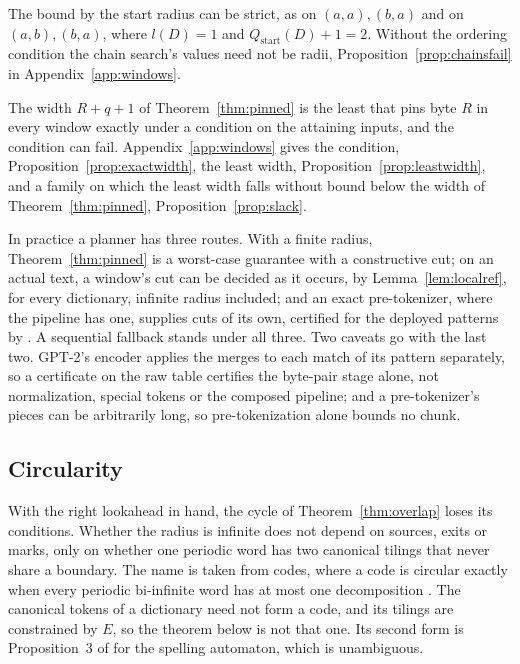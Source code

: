 \documentclass[11pt,a4paper]{article}
\theoremstyle{definition}
\theoremstyle{plain}
\begin{document}
The bound by the start radius can be strict, as on \((a, a), (b, a)\) and on \((a, b), (b, a)\), where \(l(D) = 1\) and
\(Q_{\mathrm{start}}(D) + 1 = 2\). Without the ordering condition the chain search's values need not be radii,
Proposition~\ref{prop:chainsfail} in Appendix~\ref{app:windows}.

The width \(R + q + 1\) of Theorem~\ref{thm:pinned} is the least that pins byte \(R\) in every window exactly under a
condition on the attaining inputs, and the condition can fail. Appendix~\ref{app:windows} gives the condition,
Proposition~\ref{prop:exactwidth}, the least width, Proposition~\ref{prop:leastwidth}, and a family on which the least
width falls without bound below the width of Theorem~\ref{thm:pinned}, Proposition~\ref{prop:slack}.

In practice a planner has three routes. With a finite radius, Theorem~\ref{thm:pinned} is a worst-case guarantee with a
constructive cut; on an actual text, a window's cut can be decided as it occurs, by Lemma~\ref{lem:localref}, for every
dictionary, infinite radius included; and an exact pre-tokenizer, where the pipeline has one, supplies cuts of its own,
certified for the deployed patterns by \citet{nidhogg2026pretokenizer}. A sequential fallback stands under all three.
Two caveats go with the last two. GPT-2's encoder applies the merges to each match of its pattern separately, so a
certificate on the raw table certifies the byte-pair stage alone, not normalization, special tokens or the composed
pipeline; and a pre-tokenizer's pieces can be arbitrarily long, so pre-tokenization alone bounds no chunk.

\subsection{Circularity}\label{sec:circularity}

With the right lookahead in hand, the cycle of Theorem~\ref{thm:overlap} loses its conditions. Whether the radius is
infinite does not depend on sources, exits or marks, only on whether one periodic word has two canonical tilings that
never share a boundary. The name is taken from codes, where a code is circular exactly when every periodic bi-infinite
word has at most one decomposition \citep[Proposition~2.9]{devolder1992finitary}. The canonical tokens of a dictionary
need not form a code, and its tilings are constrained by \(E\), so the theorem below is not that one. Its second form is
Proposition~3 of \citet{beal2024unambiguously} for the spelling automaton, which is unambiguous.
\end{document}
